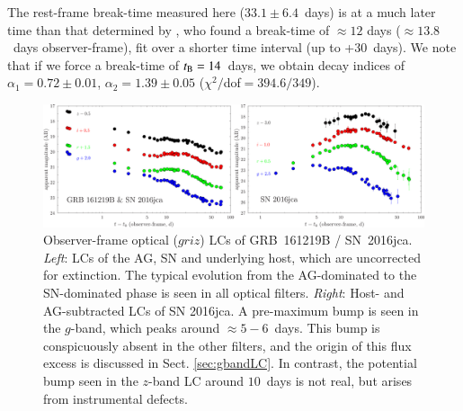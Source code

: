 \documentclass[traditabstract,longauth]{aa}
\begin{document}
The rest-frame break-time measured here ($33.1\pm6.4$~days) is at a much later time than that determined by \citet{Ashall17}, who found a break-time of $\approx 12$ days ($\approx 13.8$~days observer-frame), fit over a shorter time interval (up to +30~days).  We note that if we force a break-time of $t_{\rm B} = 14$~days, we obtain decay indices of $\alpha_{1} = 0.72\pm0.01$, $\alpha_{2} = 1.39\pm0.05$ ($\chi^2/$dof$ = 394.6/349$).  %

\begin{figure}
   \includegraphics[scale=0.417]{Fig5_GRB161219B_SN_optical-eps-converted-to.pdf}
      \caption{Observer-frame optical ($griz$) LCs of GRB~161219B / SN~2016jca. \textit{Left}: LCs of the AG, SN and underlying host, which are uncorrected for extinction.  The typical evolution from the AG-dominated to the SN-dominated phase is seen in all optical filters. \textit{Right}: Host- and AG-subtracted LCs of SN 2016jca. A pre-maximum bump is seen in the $g$-band, which peaks around $\approx 5-6$~days. This bump is conspicuously absent in the other filters, and the origin of this flux excess is discussed in Sect. \ref{sec:gbandLC}.  In contrast, the potential bump seen in the $z$-band LC around $10$~days is not real, but arises from instrumental defects.}
    \label{FigLC_optical}
   \end{figure}
\end{document}
